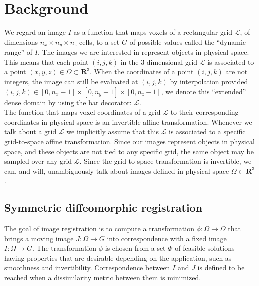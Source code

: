 \section{Background}

We regard an image $I$ as a function that maps voxels of a rectangular grid \hbox{$\mathcal{L}$}, of dimensions $n_{x} \times n_{y} \times n_{z}$ cells, to a set $G$ of
possible values called the ``dynamic range'' of $I$. The images we are interested in represent objects in physical space. This means that each point $(i,j,k)$ in the
3-dimensional grid $\mathcal{L}$ is associated to a point $(x,y,z) \in \Omega \subset \mathbf{R}^{3}$. When the coordinates of a point
\hbox{$(i,j,k)$} are not integers, the image can still be evaluated at $(i, j, k)$ by interpolation provided
\hbox{$(i,j,k) \in \left[0, n_{x}-1\right] \times \left[0, n_{y}-1\right] \times \left[0, n_{z}-1\right]$}, we denote this ``extended'' dense domain by using the bar decorator:
$\bar{\mathcal{L}}$.\\

The function that maps voxel coordinates of a grid $\mathcal{L}$ to their corresponding coordinates in physical space is an invertible affine transformation. Whenever we talk about
a grid $\mathcal{L}$ we implicitly assume that this $\mathcal{L}$ is associated to a specific grid-to-space affine transformation.
Since our images represent objects in physical space, and these objects are not tied to any specific grid, the same object may be sampled over any grid $\mathcal{L}$. Since
the grid-to-space transformation is invertible, we can, and will, unambiguously talk about images defined in physical space $\Omega \subset \mathbf{R}^{3}$.\\

\subsection{Symmetric diffeomorphic registration}

The goal of image registration is to compute a transformation $\phi: \Omega \rightarrow \Omega$ that brings a moving image $J:\Omega \rightarrow G$ into correspondence
with a fixed image $I:\Omega \rightarrow G$. The transformation $\phi$ is chosen from a set $\Phi$ of feasible solutions having properties that are desirable depending on the
application, such as smoothness and invertibility. Correspondence between $I$ and $J$ is defined to be reached when a dissimilarity metric between them is minimized.\\

